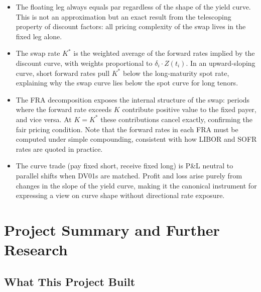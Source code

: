 \documentclass{article}
\theoremstyle{definition}  %
\theoremstyle{plain}  %
\numberwithin{definition}{section}
\numberwithin{proposition}{section}
\numberwithin{theorem}{section}
\numberwithin{equation}{section}
\begin{document}
\begin{itemize}
    \item The floating leg always equals par regardless of the shape of the yield curve. This is not an approximation but an exact result from the telescoping property of discount factors: all pricing complexity of the swap lives in the fixed leg alone.

    \item The swap rate $K^*$ is the weighted average of the forward rates implied by the discount curve, with weights proportional to $\delta_i \cdot Z(t_i)$. In an upward-sloping curve, short forward rates pull $K^*$ below the long-maturity spot rate, explaining why the swap curve lies below the spot curve for long tenors.

    \item The FRA decomposition exposes the internal structure of the swap: periods where the forward rate exceeds $K$ contribute positive value to the fixed payer, and vice versa. At $K = K^*$ these contributions cancel exactly, confirming the fair pricing condition. Note that the forward rates in each FRA must be computed under simple compounding, consistent with how LIBOR and SOFR rates are quoted in practice.

    \item The curve trade (pay fixed short, receive fixed long) is P\&L neutral to parallel shifts when DV01s are matched. Profit and loss arise purely from changes in the slope of the yield curve, making it the canonical instrument for expressing a view on curve shape without directional rate exposure.
\end{itemize}

\newpage

\section{Project Summary and Further Research}

\subsection*{What This Project Built}
\end{document}
